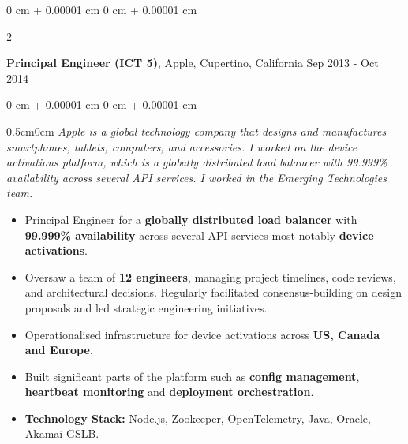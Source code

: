 \documentclass[10pt, letterpaper]{article}
\newenvironment{highlights}{
    \begin{itemize}[
        topsep=0.10 cm,
        parsep=0.10 cm,
        partopsep=0pt,
        itemsep=0pt,
        leftmargin=0 cm + 10pt
    ]
}{
    \end{itemize}
} %
\newenvironment{onecolentry}{
    \begin{adjustwidth}{
        0 cm + 0.00001 cm
    }{
        0 cm + 0.00001 cm
    }
}{
    \end{adjustwidth}
} %
\newenvironment{twocolentry}[2][]{
    \onecolentry
    \def\secondColumn{#2}
    \setcolumnwidth{\fill, 4.5 cm}
    \begin{paracol}{2}
}{
    \switchcolumn \raggedleft \secondColumn
    \end{paracol}
    \endonecolentry
} %
\begin{document}
        \vspace{0.15 cm}
        \begin{twocolentry}{
            Sep 2013 - Oct 2014
        }
            \textbf{Principal Engineer (ICT 5)}, Apple, Cupertino, California\end{twocolentry}
        \vspace{0.10 cm}
        \begin{onecolentry}
            \begin{adjustwidth}{0.5cm}{0cm}
            \textit{Apple is a global technology company that designs and manufactures smartphones, tablets, computers, and accessories. I worked on the device activations platform, which is a globally distributed load balancer with 99.999\% availability across several API services. I worked in the Emerging Technologies team.}
            \end{adjustwidth}
            
            \vspace{0.10 cm}
            \begin{highlights}
                \item Principal Engineer for a \textbf{globally distributed load balancer} with \textbf{99.999\% availability} across several API services most notably \textbf{device activations}.
                \item Oversaw a team of \textbf{12 engineers}, managing project timelines, code reviews, and architectural decisions. Regularly facilitated consensus-building on design proposals and led strategic engineering initiatives.
                \item Operationalised infrastructure for device activations across \textbf{US, Canada and Europe}.
                \item Built significant parts of the platform such as \textbf{config management}, \textbf{heartbeat monitoring} and \textbf{deployment orchestration}.
                \item \textbf{Technology Stack:} Node.js, Zookeeper, OpenTelemetry, Java, Oracle, Akamai GSLB.
            \end{highlights}
        \end{onecolentry}
\end{document}
